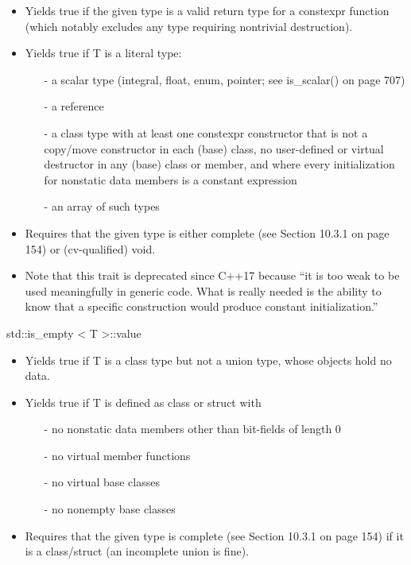 \begin{itemize}
\item 
Yields true if the given type is a valid return type for a constexpr function (which notably excludes any type requiring nontrivial destruction).

\item 
Yields true if T is a literal type:

\begin{itemize}
\item [-]
a scalar type (integral, float, enum, pointer; see is\_scalar() on page 707)

\item [-]
a reference

\item [-]
a class type with at least one constexpr constructor that is not a copy/move constructor in each (base) class, no user-defined or virtual destructor in any (base) class or member, and where every initialization for nonstatic data members is a constant expression

\item [-]
an array of such types
\end{itemize}

\item 
Requires that the given type is either complete (see Section 10.3.1 on page 154) or (cv-qualified) void.

\item 
Note that this trait is deprecated since C++17 because “it is too weak to be used meaningfully in generic code. What is really needed is the ability to know that a specific construction would produce constant initialization.”
\end{itemize}

std::is\_empty < T >::value

\begin{itemize}
\item 
Yields true if T is a class type but not a union type, whose objects hold no data.

\item 
Yields true if T is defined as class or struct with

\begin{itemize}
\item [-]
no nonstatic data members other than bit-fields of length 0

\item [-]
no virtual member functions

\item [-]
no virtual base classes

\item [-]
no nonempty base classes
\end{itemize}

\item 
Requires that the given type is complete (see Section 10.3.1 on page 154) if it is a class/struct (an incomplete union is fine).
\end{itemize}

